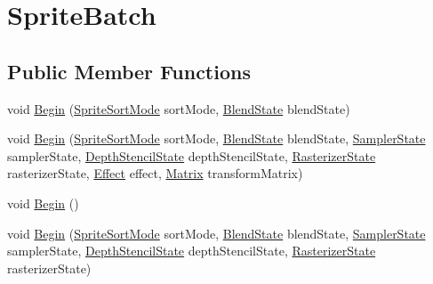 \hypertarget{classMicrosoft_1_1Xna_1_1Framework_1_1Graphics_1_1SpriteBatch}{}\section{Sprite\+Batch}
\label{classMicrosoft_1_1Xna_1_1Framework_1_1Graphics_1_1SpriteBatch}
\subsection*{Public Member Functions}
\begin{DoxyCompactItemize}
\item 
void \hyperlink{classMicrosoft_1_1Xna_1_1Framework_1_1Graphics_1_1SpriteBatch_a854657bf1499f3f6e326ae60164d8bcd}{Begin} (\hyperlink{namespaceMicrosoft_1_1Xna_1_1Framework_1_1Graphics_a624fcd3c36bfc7628a4e4aacf3cee0cb}{Sprite\+Sort\+Mode} sort\+Mode, \hyperlink{classMicrosoft_1_1Xna_1_1Framework_1_1Graphics_1_1BlendState}{Blend\+State} blend\+State)
\item 
void \hyperlink{classMicrosoft_1_1Xna_1_1Framework_1_1Graphics_1_1SpriteBatch_a28624569ae6dbfca5c579fb0ee3144d7}{Begin} (\hyperlink{namespaceMicrosoft_1_1Xna_1_1Framework_1_1Graphics_a624fcd3c36bfc7628a4e4aacf3cee0cb}{Sprite\+Sort\+Mode} sort\+Mode, \hyperlink{classMicrosoft_1_1Xna_1_1Framework_1_1Graphics_1_1BlendState}{Blend\+State} blend\+State, \hyperlink{classMicrosoft_1_1Xna_1_1Framework_1_1Graphics_1_1SamplerState}{Sampler\+State} sampler\+State, \hyperlink{classMicrosoft_1_1Xna_1_1Framework_1_1Graphics_1_1DepthStencilState}{Depth\+Stencil\+State} depth\+Stencil\+State, \hyperlink{classMicrosoft_1_1Xna_1_1Framework_1_1Graphics_1_1RasterizerState}{Rasterizer\+State} rasterizer\+State, \hyperlink{classMicrosoft_1_1Xna_1_1Framework_1_1Graphics_1_1Effect}{Effect} effect, \hyperlink{structMicrosoft_1_1Xna_1_1Framework_1_1Matrix}{Matrix} transform\+Matrix)
\item 
void \hyperlink{classMicrosoft_1_1Xna_1_1Framework_1_1Graphics_1_1SpriteBatch_a1149e1e7da0129dfcc98c047dcdf9c79}{Begin} ()
\item 
void \hyperlink{classMicrosoft_1_1Xna_1_1Framework_1_1Graphics_1_1SpriteBatch_ada438dee974c0226c0efb74b04741ea2}{Begin} (\hyperlink{namespaceMicrosoft_1_1Xna_1_1Framework_1_1Graphics_a624fcd3c36bfc7628a4e4aacf3cee0cb}{Sprite\+Sort\+Mode} sort\+Mode, \hyperlink{classMicrosoft_1_1Xna_1_1Framework_1_1Graphics_1_1BlendState}{Blend\+State} blend\+State, \hyperlink{classMicrosoft_1_1Xna_1_1Framework_1_1Graphics_1_1SamplerState}{Sampler\+State} sampler\+State, \hyperlink{classMicrosoft_1_1Xna_1_1Framework_1_1Graphics_1_1DepthStencilState}{Depth\+Stencil\+State} depth\+Stencil\+State, \hyperlink{classMicrosoft_1_1Xna_1_1Framework_1_1Graphics_1_1RasterizerState}{Rasterizer\+State} rasterizer\+State)

\end{DoxyCompactItemize}
